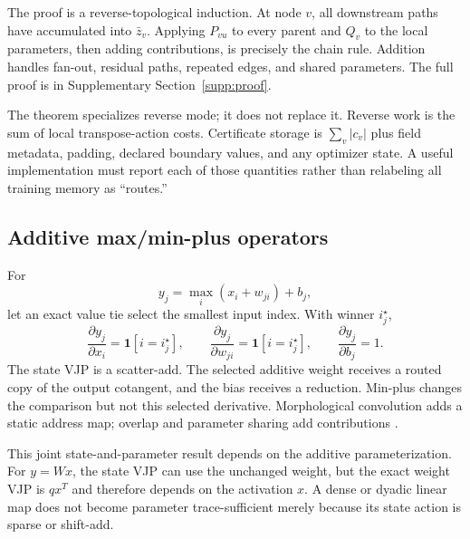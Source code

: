 \documentclass[10pt]{article}
\begin{document}
The proof is a reverse-topological induction.  At node $v$, all downstream
paths have accumulated into $\bar z_v$.  Applying $P_{vu}$ to every parent and
$Q_v$ to the local parameters, then adding contributions, is precisely the
chain rule.  Addition handles fan-out, residual paths, repeated edges, and
shared parameters.  The full proof is in Supplementary Section~\ref{supp:proof}.

The theorem specializes reverse mode; it does not replace it.  Reverse work is
the sum of local transpose-action costs.  Certificate storage is
$\sum_v |c_v|$ plus field metadata, padding, declared boundary values, and any
optimizer state.  A useful implementation must report each of those quantities
rather than relabeling all training memory as ``routes.''

\subsection{Additive max/min-plus operators}

For
\begin{equation}
 y_j=\max_i(x_i+w_{ji})+b_j,
\end{equation}
let an exact value tie select the smallest input index.  With winner
$i_j^\star$,
\begin{equation}
 \frac{\partial y_j}{\partial x_i}=\mathbf{1}[i=i_j^\star],\qquad
 \frac{\partial y_j}{\partial w_{ji}}=\mathbf{1}[i=i_j^\star],\qquad
 \frac{\partial y_j}{\partial b_j}=1.
\end{equation}
The state VJP is a scatter-add.  The selected additive weight receives a routed
copy of the output cotangent, and the bias receives a reduction.  Min-plus
changes the comparison but not this selected derivative.  Morphological
convolution adds a static address map; overlap and parameter sharing add
contributions \citep{franchi2020morphological,groenendijk2023geometric}.

This joint state-and-parameter result depends on the additive parameterization.
For $y=Wx$, the state VJP can use the unchanged weight, but the exact weight
VJP is $qx^T$ and therefore depends on the activation $x$.  A dense or dyadic
linear map does not become parameter trace-sufficient merely because its state
action is sparse or shift-add.
\end{document}
